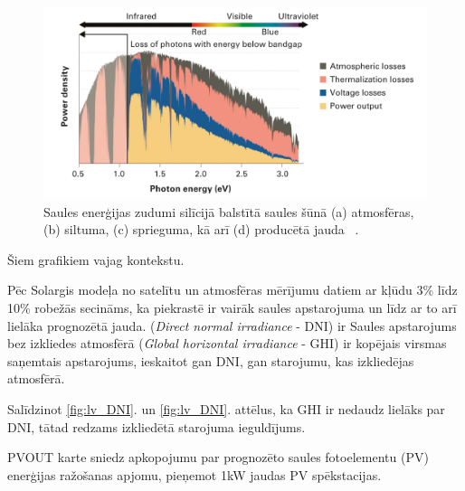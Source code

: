 \begin{figure}[h]
    \centering
    \includegraphics[width=\linewidth]{figures/misc/energyLosses.png}
    \caption{Saules enerģijas zudumi silīcijā balstītā saules šūnā (a) atmosfēras, (b) siltuma, (c) sprieguma, kā arī (d) producētā jauda  ~\cite{Sivaram}.}
    \label{fig:energyLoss}
\end{figure}


Šiem grafikiem vajag kontekstu.

Pēc Solargis modeļa no satelītu un atmosfēras mērījumu datiem ar kļūdu 3\% līdz 10\% robežās secināms, ka piekrastē ir vairāk saules apstarojuma un līdz ar to arī lielāka prognozētā jauda. 
(\textit{Direct normal irradiance} - DNI) ir Saules apstarojums bez izkliedes atmosfērā
(\textit{Global horizontal irradiance} - GHI) ir kopējais virsmas saņemtais apstarojums, ieskaitot gan DNI, gan starojumu, kas izkliedējas atmosfērā.

Salīdzinot \ref{fig:lv_DNI}. un  \ref{fig:lv_DNI}. attēlus, ka GHI ir nedaudz lielāks par DNI, tātad redzams izkliedētā starojuma ieguldījums.

PVOUT karte sniedz apkopojumu par prognozēto saules fotoelementu (PV) enerģijas ražošanas apjomu, pieņemot 1kW jaudas PV spēkstacijas.







